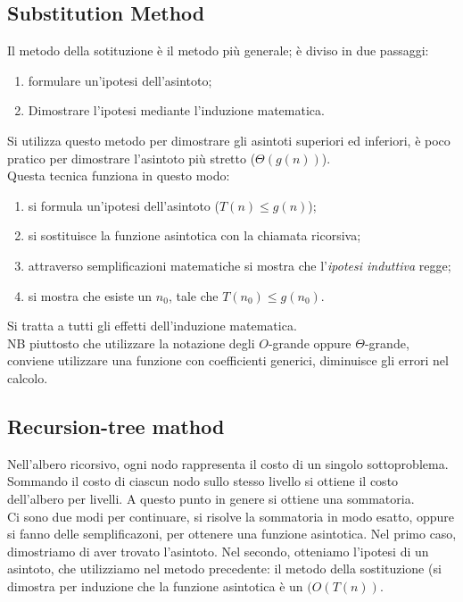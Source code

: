 \documentclass{article}
\begin{document}
\subsection{Substitution Method}
Il metodo della sotituzione è il metodo più generale; è diviso in due passaggi:
\begin{enumerate}
    \item formulare un'ipotesi dell'asintoto;
    \item Dimostrare l'ipotesi mediante l'induzione matematica.
\end{enumerate}

Si utilizza questo metodo per dimostrare gli asintoti superiori ed inferiori, è
poco pratico per dimostrare l'asintoto più stretto ($\Theta(g(n))$).\\
Questa tecnica funziona in questo modo:
\begin{enumerate}
    \item si formula un'ipotesi dell'asintoto ($T(n) \leq g(n)$);
    \item si sostituisce la funzione asintotica con la chiamata ricorsiva;
    \item attraverso semplificazioni matematiche si mostra che l'\textit{ipotesi
        induttiva} regge;
    \item si mostra che esiste un $n_0$, tale che $T(n_0) \leq g(n_0)$.
\end{enumerate}

Si tratta a tutti gli effetti dell'induzione matematica.\\
NB piuttosto che utilizzare la notazione degli $O$-grande oppure
$\Theta$-grande, conviene utilizzare una funzione con coefficienti generici,
diminuisce gli errori nel calcolo. 

\subsection{Recursion-tree mathod}
Nell'albero ricorsivo, ogni nodo rappresenta il costo di un singolo
sottoproblema. Sommando il costo di ciascun nodo sullo stesso livello si ottiene
il costo dell'albero per livelli. A questo punto in genere si ottiene una
sommatoria.\\
Ci sono due modi per continuare, si risolve la sommatoria in modo esatto, oppure
si fanno delle semplificazoni, per ottenere una funzione asintotica. Nel primo
caso, dimostriamo di aver trovato l'asintoto. Nel secondo, otteniamo l'ipotesi
di un asintoto, che utilizziamo nel metodo precedente: il metodo della
sostituzione (si dimostra per induzione che la funzione asintotica è un
$(O(T(n))$.
\end{document}
